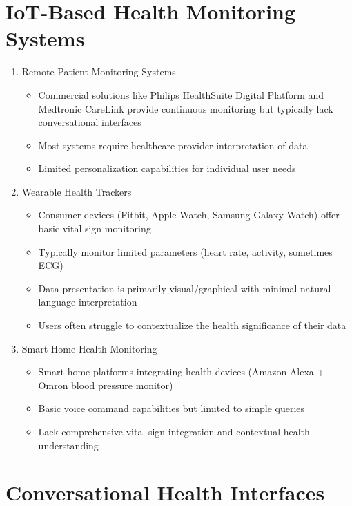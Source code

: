 \section{IoT-Based Health Monitoring Systems}

\begin{enumerate}
    \item Remote Patient Monitoring Systems
    \begin{itemize}
        \item Commercial solutions like Philips HealthSuite Digital Platform and Medtronic CareLink provide continuous monitoring but typically lack conversational interfaces
        \item Most systems require healthcare provider interpretation of data
        \item Limited personalization capabilities for individual user needs
    \end{itemize}

    \item Wearable Health Trackers
    \begin{itemize}
        \item Consumer devices (Fitbit, Apple Watch, Samsung Galaxy Watch) offer basic vital sign monitoring
        \item Typically monitor limited parameters (heart rate, activity, sometimes ECG)
        \item Data presentation is primarily visual/graphical with minimal natural language interpretation
        \item Users often struggle to contextualize the health significance of their data
    \end{itemize}

    \item Smart Home Health Monitoring
    \begin{itemize}
        \item Smart home platforms integrating health devices (Amazon Alexa + Omron blood pressure monitor)
        \item Basic voice command capabilities but limited to simple queries
        \item Lack comprehensive vital sign integration and contextual health understanding
    \end{itemize}
\end{enumerate}

\section{Conversational Health Interfaces}

